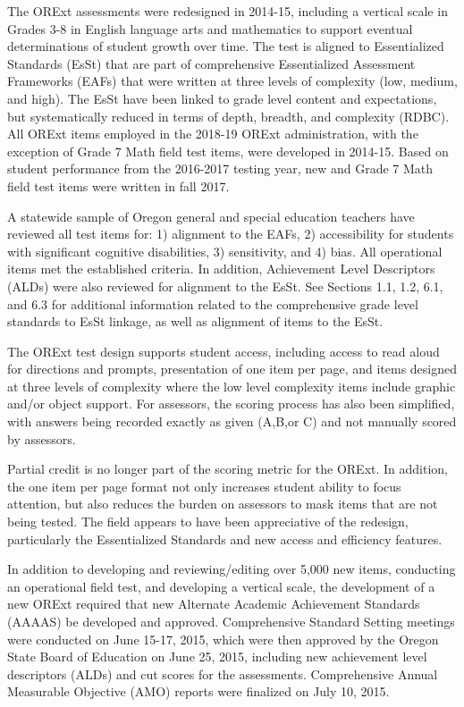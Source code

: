 \documentclass[]{article}
\begin{document}
The ORExt assessments were redesigned in 2014-15, including a vertical
scale in Grades 3-8 in English language arts and mathematics to support
eventual determinations of student growth over time. The test is aligned
to Essentialized Standards (EsSt) that are part of comprehensive
Essentialized Assessment Frameworks (EAFs) that were written at three
levels of complexity (low, medium, and high). The EsSt have been linked
to grade level content and expectations, but systematically reduced in
terms of depth, breadth, and complexity (RDBC). All ORExt items employed
in the 2018-19 ORExt administration, with the exception of Grade 7 Math
field test items, were developed in 2014-15. Based on student
performance from the 2016-2017 testing year, new and Grade 7 Math field
test items were written in fall 2017.

A statewide sample of Oregon general and special education teachers have
reviewed all test items for: 1) alignment to the EAFs, 2) accessibility
for students with significant cognitive disabilities, 3) sensitivity,
and 4) bias. All operational items met the established criteria. In
addition, Achievement Level Descriptors (ALDs) were also reviewed for
alignment to the EsSt. See Sections 1.1, 1.2, 6.1, and 6.3 for
additional information related to the comprehensive grade level
standards to EsSt linkage, as well as alignment of items to the EsSt.

The ORExt test design supports student access, including access to read
aloud for directions and prompts, presentation of one item per page, and
items designed at three levels of complexity where the low level
complexity items include graphic and/or object support. For assessors,
the scoring process has also been simplified, with answers being
recorded exactly as given (A,B,or C) and not manually scored by
assessors.

Partial credit is no longer part of the scoring metric for the ORExt. In
addition, the one item per page format not only increases student
ability to focus attention, but also reduces the burden on assessors to
mask items that are not being tested. The field appears to have been
appreciative of the redesign, particularly the Essentialized Standards
and new access and efficiency features.

In addition to developing and reviewing/editing over 5,000 new items,
conducting an operational field test, and developing a vertical scale,
the development of a new ORExt required that new Alternate Academic
Achievement Standards (AAAAS) be developed and approved. Comprehensive
Standard Setting meetings were conducted on June 15-17, 2015, which were
then approved by the Oregon State Board of Education on June 25, 2015,
including new achievement level descriptors (ALDs) and cut scores for
the assessments. Comprehensive Annual Measurable Objective (AMO) reports
were finalized on July 10, 2015.
\end{document}
